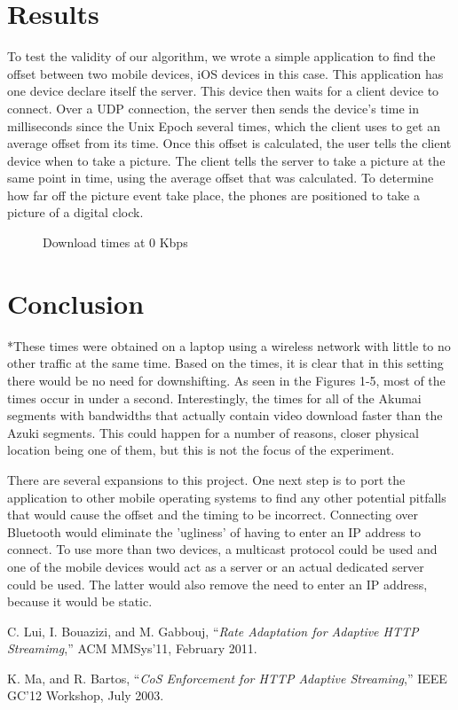 \documentclass[10pt]{IEEEtran}
\begin{document}
\section{Results}

To test the validity of our algorithm, we wrote a simple application to find 
the offset between two mobile devices, iOS devices in this case. This
application has one device declare itself the server. This device then waits for
a client device to connect. Over a UDP connection, the server then sends the
device's time in milliseconds since the Unix Epoch several times, which the
client uses to get an average offset from its time. Once this offset is
calculated, the user tells the client device when to take a picture. The client
tells the server to take a picture at the same point in time, using the average
offset that was calculated. To determine how far off the picture event take
place, the phones are positioned to take a picture of a digital clock.


\begin{figure}
{}
\caption{Download times at 0 Kbps}
\label{fig:graph0}
\end{figure}

\section{Conclusion}

*These times were obtained on a laptop using a wireless network with little to 
no other traffic at the same time. Based on the times, it is clear that in this
setting there would be no need for downshifting. As seen in the Figures 1-5,
most of the times occur in under a second. Interestingly, the times for all of 
the Akumai segments with bandwidths that actually contain video download faster 
than the Azuki segments. This could happen for a number of reasons, closer 
physical location being one of them, but this is not the focus of the 
experiment.

There are several expansions to this project. One next step is to port the 
application to other mobile operating systems to find any other potential 
pitfalls that would cause the offset and the timing to be incorrect. Connecting
over Bluetooth would eliminate the 'ugliness' of having to enter an IP address
to connect. To use more than two devices, a multicast protocol could be used and
one of the mobile devices would act as a server or an actual dedicated server
could be used. The latter would also remove the need to enter an IP address,
because it would be static. 

\begin{thebibliography}{1}

C. Lui, I. Bouazizi, and M. Gabbouj, ``\emph{Rate Adaptation for Adaptive HTTP
Streamimg},'' ACM MMSys'11, February 2011.

K. Ma, and R. Bartos, ``\emph{CoS Enforcement for HTTP Adaptive Streaming},'' 
IEEE GC'12 Workshop, July 2003.

\end{thebibliography}
\end{document}
